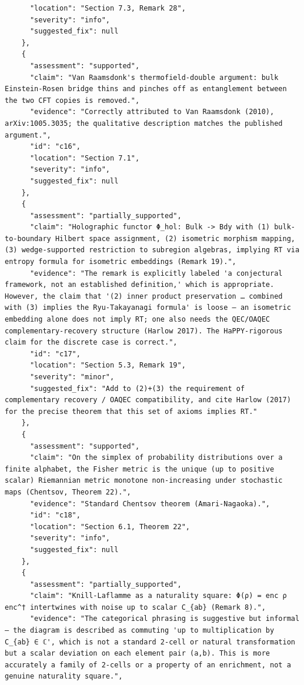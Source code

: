 \documentclass[11pt]{article}
\begin{document}
\begin{verbatim}
      "location": "Section 7.3, Remark 28",
      "severity": "info",
      "suggested_fix": null
    },
    {
      "assessment": "supported",
      "claim": "Van Raamsdonk's thermofield-double argument: bulk Einstein-Rosen bridge thins and pinches off as entanglement between the two CFT copies is removed.",
      "evidence": "Correctly attributed to Van Raamsdonk (2010), arXiv:1005.3035; the qualitative description matches the published argument.",
      "id": "c16",
      "location": "Section 7.1",
      "severity": "info",
      "suggested_fix": null
    },
    {
      "assessment": "partially_supported",
      "claim": "Holographic functor Φ_hol: Bulk -> Bdy with (1) bulk-to-boundary Hilbert space assignment, (2) isometric morphism mapping, (3) wedge-supported restriction to subregion algebras, implying RT via entropy formula for isometric embeddings (Remark 19).",
      "evidence": "The remark is explicitly labeled 'a conjectural framework, not an established definition,' which is appropriate. However, the claim that '(2) inner product preservation … combined with (3) implies the Ryu-Takayanagi formula' is loose — an isometric embedding alone does not imply RT; one also needs the QEC/OAQEC complementary-recovery structure (Harlow 2017). The HaPPY-rigorous claim for the discrete case is correct.",
      "id": "c17",
      "location": "Section 5.3, Remark 19",
      "severity": "minor",
      "suggested_fix": "Add to (2)+(3) the requirement of complementary recovery / OAQEC compatibility, and cite Harlow (2017) for the precise theorem that this set of axioms implies RT."
    },
    {
      "assessment": "supported",
      "claim": "On the simplex of probability distributions over a finite alphabet, the Fisher metric is the unique (up to positive scalar) Riemannian metric monotone non-increasing under stochastic maps (Chentsov, Theorem 22).",
      "evidence": "Standard Chentsov theorem (Amari-Nagaoka).",
      "id": "c18",
      "location": "Section 6.1, Theorem 22",
      "severity": "info",
      "suggested_fix": null
    },
    {
      "assessment": "partially_supported",
      "claim": "Knill-Laflamme as a naturality square: Φ(ρ) = enc ρ enc^† intertwines with noise up to scalar C_{ab} (Remark 8).",
      "evidence": "The categorical phrasing is suggestive but informal — the diagram is described as commuting 'up to multiplication by C_{ab} ∈ ℂ', which is not a standard 2-cell or natural transformation but a scalar deviation on each element pair (a,b). This is more accurately a family of 2-cells or a property of an enrichment, not a genuine naturality square.",

\end{verbatim}
\end{document}
